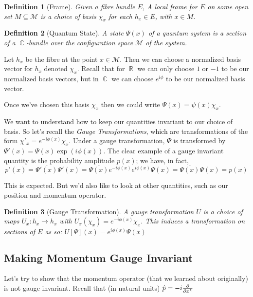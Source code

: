 \documentclass{article}
\DeclareMathOperator{\RR}{\mathbb{R}}
\DeclareMathOperator{\CC}{\mathbb{C}}
\newtheorem{defn}{Definition}
\begin{document}
\begin{defn}[Frame]
	Given a fibre bundle $E$, A \textit{local frame} for $E$ on some open set $M \subseteq \mathcal{M}$ is a choice of basis $\chi_x$ for each $h_x \in E$, with $x \in M$.
\end{defn}

\begin{defn}[Quantum State]
	A state $\Psi(x)$ of a quantum system is a \textit{section} of a $\CC$-bundle over the configuration space $\mathcal{M}$ of the system.
\end{defn}

Let $h_x$ be the fibre at the point $x \in \mathcal{M}$. Then we can choose a normalized basis vector for $h_x$ denoted $\chi_x$. Recall that for $\RR$ we can only choose $1$ or $-1$ to be our normalized basis vectors, but in $\CC$ we can choose $e^{i\phi}$ to be our normalized basis vector.

Once we've chosen this basis $\chi_x$ then we could write $\Psi(x) = \psi(x) \chi_x$.

We want to understand how to keep our quantities invariant to our choice of basis. So let's recall the \textit{Gauge Transformations}, which are transformations of the form $\chi'_x = e^{-i\phi(x)}\chi_x$. Under a gauge transformation, $\Psi$ is transformed by $\Psi'(x) = \Psi(x) \exp(i\phi(x))$. The clear example of a gauge invariant quantity is the probability amplitude $p(x)$; we have, in fact, 
\[p'(x)= \overline{\Psi'(x)}\Psi'(x)= \overline{\Psi(x)} e^{-i\phi(x)}e^{i\phi(x)}\Psi(x)=\overline{\Psi(x)}\Psi(x)=p(x)  \]

 This is expected. But we'd also like to look at other quantities, such as our position and momentum operator.

\begin{defn}[Gauge Transformation]
	A gauge transformation $U$ is a choice of maps $U_x : h_x \to h_x$ with $U_x(\chi_x) = e^{-i\phi(x)}\chi_x$. This induces a transformation on sections of $E$ as so: $U[\Psi](x) = e^{i\phi(x)}\Psi(x) $
\end{defn}

\subsection{Making Momentum Gauge Invariant}

Let's try to show that the momentum operator (that we learned about originally) is not gauge invariant. Recall that (in natural units) $\hat p = -i \pdv{x^k}$
\end{document}
